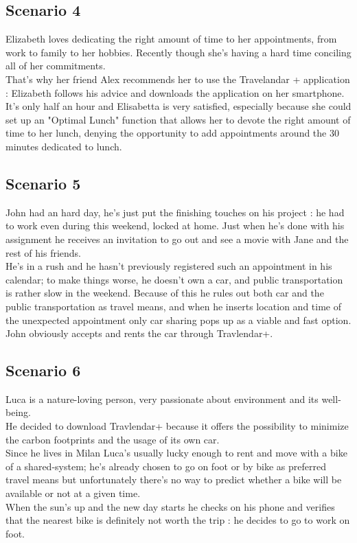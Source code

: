 \subsection{Scenario 4}

Elizabeth loves dedicating the right amount of time to her appointments, from work to family to her hobbies. Recently though she’s having a hard time conciling all of her commitments.\\ 
That’s why her friend Alex recommends her to use the Travelandar + application : Elizabeth follows his advice and downloads the application on her smartphone.\\
It’s only half an hour and Elisabetta is very satisfied, especially because she could set up an "Optimal Lunch" function that allows her to devote the right amount of time to her lunch, denying the opportunity to add appointments around the 30 minutes dedicated to lunch.

\subsection {Scenario 5}

John had an hard day, he’s just put the finishing touches on his project : he had to work even during this weekend, locked at home. Just when he’s done with his assignment he receives an invitation to go out and see a movie with Jane and the rest of his friends.\\
He’s in a rush and he hasn’t previously registered such an appointment in his calendar; to make things worse, he doesn’t own a car, and public transportation is rather slow in the weekend. Because of this he rules out both car and the public transportation as travel means, and when he inserts location and time of the unexpected appointment only car sharing pops up as a viable and fast option.\\ 
John obviously accepts and rents the car through Travlendar+. 

\subsection {Scenario 6}

Luca is a nature-loving person, very passionate about environment and its well-being.\\
He decided to download Travlendar+ because it offers the possibility to minimize the carbon footprints and the usage of its own car.\\
Since he lives in Milan Luca’s usually lucky enough to rent and move with a bike of a shared-system; he’s already chosen to go on foot or by bike as preferred travel means but unfortunately there’s no way to predict whether a bike will be available or not at a given time.\\
When the sun’s up and the new day starts he checks on his phone and verifies that the nearest bike is definitely not worth the trip : he decides to go to work on foot.


